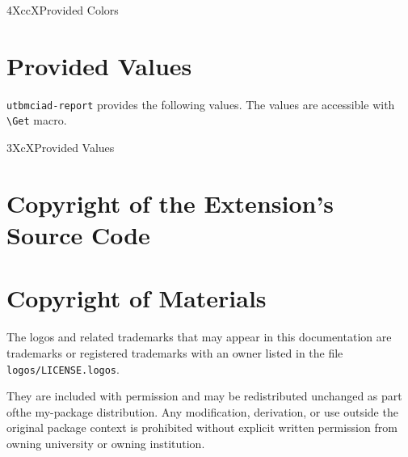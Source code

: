 \documentclass[article,nodocrefonfront,nodocrefonback]{utbmciadreport}
\gdef\upmextensiondoccolorlist{}
\gdef\upmextensiondocvaluelist{}
\begin{document}
\begin{mtabular}{4}{XccX}{Provided Colors}
\upmextensiondoccolorlist
\end{mtabular}

\section{Provided Values}

\texttt{utbmciad-report} provides the following values. The values are accessible with \texttt{{\textbackslash}Get} macro.

\begin{tiny}
\begin{mtabular}{3}{XcX}{Provided Values}
\upmextensiondocvaluelist
\end{mtabular}
\end{tiny}

\section{Copyright of the Extension's Source Code}



\section{Copyright of Materials}

The logos and related trademarks that may appear in this documentation are trademarks or registered trademarks with an owner listed in the file \texttt{logos/LICENSE.logos}.

They are included with permission and may be redistributed unchanged as part ofthe my-package distribution. Any modification, derivation, or use outside the original package context is prohibited without explicit written permission from owning university or owning institution.
\end{document}
